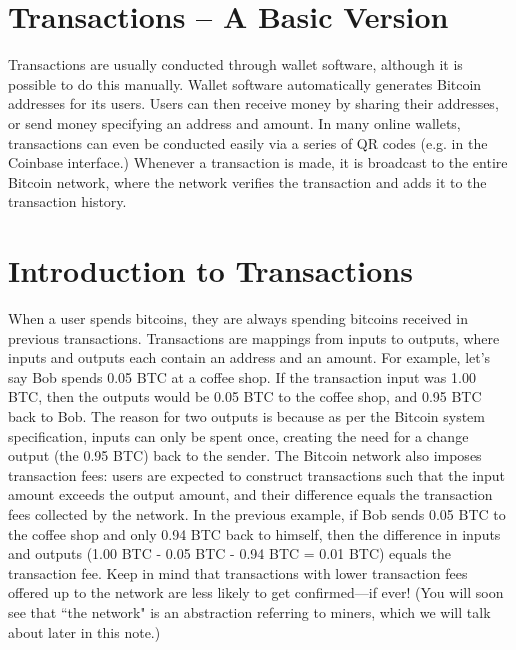 \documentclass[11pt]{article}
\begin{document}
    \section*{Transactions -- A Basic Version}
    
    Transactions are usually conducted through wallet software, although it is possible to do this manually. Wallet software automatically generates Bitcoin addresses for its users. Users can then receive money by sharing their addresses, or send money specifying an address and amount. In many online wallets, transactions can even be conducted easily via a series of QR codes (e.g. in the Coinbase interface.) Whenever a transaction is made, it is broadcast to the entire Bitcoin network, where the network verifies the transaction and adds it to the transaction history.
    
    \section*{Introduction to Transactions}
    
    When a user spends bitcoins, they are always spending bitcoins received in previous transactions. Transactions are mappings from inputs to outputs, where inputs and outputs each contain an address and an amount. For example, let's say Bob spends 0.05 BTC at a coffee shop. If the transaction input was 1.00 BTC, then the outputs would be 0.05 BTC to the coffee shop, and 0.95 BTC back to Bob. The reason for two outputs is because as per the Bitcoin system specification, inputs can only be spent once, creating the need for a change output (the 0.95 BTC) back to the sender. The Bitcoin network also imposes transaction fees: users are expected to construct transactions such that the input amount exceeds the output amount, and their difference equals the transaction fees collected by the network. In the previous example, if Bob sends 0.05 BTC to the coffee shop and only 0.94 BTC back to himself, then the difference in inputs and outputs (1.00 BTC - 0.05 BTC - 0.94 BTC = 0.01 BTC) equals the transaction fee. Keep in mind that transactions with lower transaction fees offered up to the network are less likely to get confirmed---if ever! (You will soon see that ``the network" is an abstraction referring to miners, which we will talk about later in this note.)
    
\end{document}

